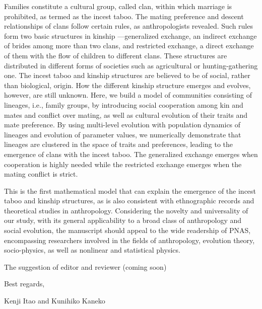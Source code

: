 \documentclass[a4j,12pt]{letter}
\begin{document}
Families constitute a cultural group, called clan, within which marriage is prohibited, as termed as the incest taboo. The mating preference and descent relationships of clans follow certain rules, as anthropologists revealed. Such rules form two basic structures in kinship ---generalized exchange, an indirect exchange of brides among more than two clans, and restricted exchange, a direct exchange of them with the flow of children to different clans. These structures are distributed in different forms of societies such as agricultural or hunting-gathering one. The incest taboo and kinship structures are believed to be of social, rather than biological, origin. How the different kinship structure emerges and evolves, however, are still unknown. 
Here, we build a model of communities consisting of lineages, i.e., family groups, by introducing social cooperation among kin and mates and conflict over mating, as well as cultural evolution of their traits and mate preference. By using multi-level evolution with population dynamics of lineages and evolution of parameter values, we numerically demonstrate that lineages are clustered in the space of traits and preferences, leading to the emergence of clans with the incest taboo. The generalized exchange emerges when cooperation is highly needed while the restricted exchange emerges when the mating conflict is strict.

This is the first mathematical model that can explain the emergence of the incest taboo and kinship structures, as is also consistent with ethnographic records and theoretical studies in anthropology.
Considering the novelty and universality of our study, with its general applicability to a broad class of anthropology and social evolution, the manuscript should appeal to the wide readership of PNAS, encompassing researchers involved in the fields of anthropology, evolution theory, socio-physics, as well as nonlinear and statistical physics.

The suggestion of editor and reviewer (coming soon)

Best regards,

Kenji Itao and Kunihiko Kaneko
\end{document}
